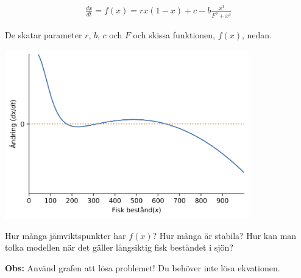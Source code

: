 \begin{enumerate}
  \[\begin{aligned}
    \frac{dx}{dt} = f(x) = r x(1- x) + c - b \frac{x^3}{F^3 + x^3}
  \end{aligned}\]

  De skatar parameter \(r\), \(b\), \(c\) och \(F\) och skissa
  funktionen, \(f(x)\), nedan.

  \includegraphics[width=4.16667in,height=\textheight]{../images/lesson1/fisk.png}

  Hur många jämviktspunkter har \(f(x)\)? Hur många är stabila? Hur kan
  man tolka modellen när det gäller långsiktig fisk beståndet i sjön?

  \textbf{Obs:} Använd grafen att lösa problemet! Du behöver inte lösa
  ekvationen.
\end{enumerate}

